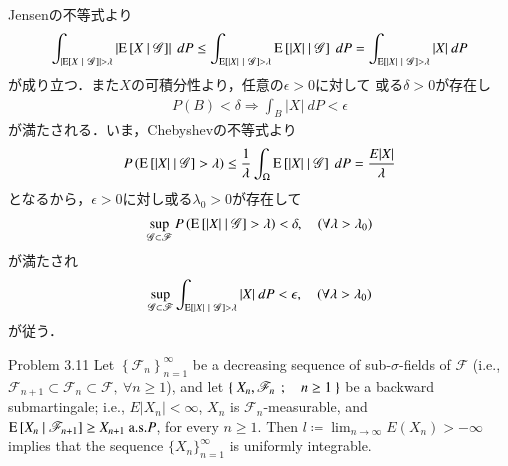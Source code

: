 	\begin{prf}
		Jensenの不等式より
				\begin{align}
					\int_{\left| \cexp{X}{\mathscr{G}} \right| > \lambda} \left| \cexp{X}{\mathscr{G}} \right|\ dP
					\leq \int_{\cexp{|X|}{\mathscr{G}} > \lambda} \cexp{|X|}{\mathscr{G}}\ dP
					= \int_{\cexp{|X|}{\mathscr{G}} > \lambda} |X|\ dP
				\end{align}
				が成り立つ．また$X$の可積分性より，任意の$\epsilon > 0$に対して
				或る$\delta > 0$が存在し
				\begin{align}
					P(B) < \delta \Rightarrow \int_B |X|\ dP < \epsilon
				\end{align}
				が満たされる．いま，Chebyshevの不等式より
				\begin{align}
					P\left( \operatorname{E} \left[ |X| \ \middle|\ \mathscr{G} \right] > \lambda \right)
					\leq \frac{1}{\lambda} \int_\Omega \operatorname{E} \left[ |X| \ \middle|\ \mathscr{G} \right]\ dP
					= \frac{E|X|}{\lambda}
				\end{align}
				となるから，$\epsilon > 0$に対し或る$\lambda_0 > 0$が存在して
				\begin{align}
					\operatorname*{sup}_{\mathscr{G} \subset \mathscr{F}} P\left( \operatorname{E} \left[ |X| \ \middle|\ \mathscr{G} \right] > \lambda \right)
					< \delta,
					\quad (\forall \lambda > \lambda_0)
				\end{align}
				が満たされ
				\begin{align}
					\operatorname*{sup}_{\mathscr{G} \subset \mathscr{F}} \int_{\operatorname{E} \left[ |X| \ \middle|\ \mathscr{G} \right] > \lambda}|X|\ dP
					< \epsilon,
					\quad (\forall \lambda > \lambda_0)
				\end{align}
				が従う．
		\QED
	\end{prf}
	
	\begin{itembox}[l]{Problem 3.11}
		Let $\left\{ \mathscr{F}_n \right\}_{n=1}^\infty$ be a decreasing sequence of sub-$\sigma$-fields of 
		$\mathscr{F}$ (i.e.,$\mathscr{F}_{n+1} \subset \mathscr{F}_n \subset \mathscr{F},\ \forall n \geq 1$),
		and let $\left\{\ X_n,\mathscr{F}_n\ \, ; \quad n \geq 1\ \right\}$ be a backward submartingale; i.e., $E|X_n| < \infty$, $X_n$
		is $\mathscr{F}_n$-measurable, and $\operatorname{E} \left[ X_n \ \middle|\ \mathscr{F}_{n+1} \right] \geq X_{n+1}\ \mbox{a.s.$P$}$, for
		every $n \geq 1$. Then $l \coloneqq \lim_{n \to \infty} E(X_n) > -\infty$ implies that the sequence $\{X_n\}_{n=1}^\infty$
		is uniformly integrable.
	\end{itembox}
	
